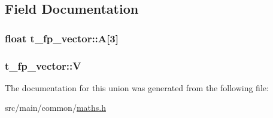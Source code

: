 \subsection{Field Documentation}
\hypertarget{uniont__fp__vector_a03cce9bae4093ec1380cc17ef7f3fa67}{
\subsubsection[{A}]{\setlength{\rightskip}{0pt plus 5cm}float t\+\_\+fp\+\_\+vector\+::\+A\mbox{[}3\mbox{]}}}\label{uniont__fp__vector_a03cce9bae4093ec1380cc17ef7f3fa67}
\hypertarget{uniont__fp__vector_aabdf935855b21c719a8216958297d54a}{
\subsubsection[{V}]{ t\+\_\+fp\+\_\+vector\+::\+V}}\label{uniont__fp__vector_aabdf935855b21c719a8216958297d54a}


The documentation for this union was generated from the following file\+:\begin{DoxyCompactItemize}
\item 
src/main/common/\hyperlink{maths_8h}{maths.\+h}\end{DoxyCompactItemize}
